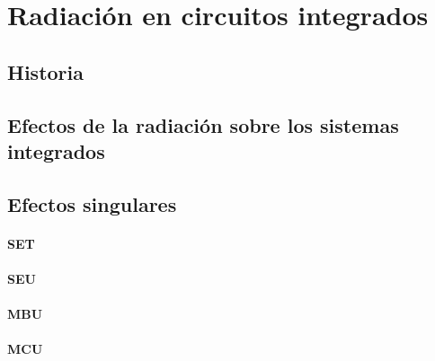 \chapter{Radiación en circuitos integrados}
\section{Historia}
\section{Efectos de la radiación sobre los sistemas integrados}
\section{Efectos singulares}
\subsubsection{SET}
\subsubsection{SEU}
\subsubsection{MBU}
\subsubsection{MCU}